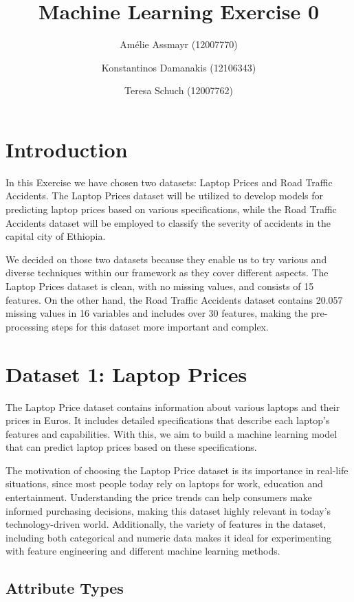 \documentclass{article}
\title{Machine Learning Exercise 0}
\author{Amélie Assmayr (12007770) \and
        Konstantinos Damanakis (12106343) \and
        Teresa Schuch (12007762)}
\begin{document}
\maketitle

\section{Introduction}

In this Exercise we have chosen two datasets: Laptop Prices and Road Traffic Accidents. The Laptop Prices dataset will be utilized to develop models for predicting laptop prices based on various specifications, while the Road Traffic Accidents dataset will be employed to classify the severity of accidents in the capital city of Ethiopia. 
\par We decided on those two datasets because they enable us to try various and diverse techniques within our framework as they cover different aspects. The Laptop Prices dataset is clean, with no missing values, and consists of 15 features. On the other hand, the Road Traffic Accidents dataset contains 20.057 missing values in 16 variables and includes over 30 features, making the pre-processing steps for this dataset more important and complex.

\section{Dataset 1: Laptop Prices}

The Laptop Price dataset contains information about various laptops and their prices in Euros. It includes detailed specifications that describe each laptop's features and capabilities. With this, we aim to build a machine learning model that can predict laptop prices based on these specifications. 
\par The motivation of choosing the Laptop Price dataset is its importance in real-life situations, since most people today rely on laptops for work, education and entertainment. Understanding the price trends can help consumers make informed purchasing decisions, making this dataset highly relevant in today’s technology-driven world. Additionally, the variety of features in the dataset, including both categorical and numeric data makes it ideal for experimenting with feature engineering and different machine learning methods.

\subsection{Attribute Types}
\end{document}

